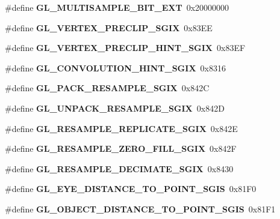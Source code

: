 \begin{DoxyCompactItemize}
\item 
\#define {\bfseries G\+L\+\_\+\+M\+U\+L\+T\+I\+S\+A\+M\+P\+L\+E\+\_\+\+B\+I\+T\+\_\+\+E\+X\+T}~0x20000000\label{_s_d_l__opengl_8h_ae7334e01278a1e31e28748ca8401ba36}

\item 
\#define {\bfseries G\+L\+\_\+\+V\+E\+R\+T\+E\+X\+\_\+\+P\+R\+E\+C\+L\+I\+P\+\_\+\+S\+G\+I\+X}~0x83\+E\+E\label{_s_d_l__opengl_8h_a042781876f40929162b2458d2ea5dafa}

\item 
\#define {\bfseries G\+L\+\_\+\+V\+E\+R\+T\+E\+X\+\_\+\+P\+R\+E\+C\+L\+I\+P\+\_\+\+H\+I\+N\+T\+\_\+\+S\+G\+I\+X}~0x83\+E\+F\label{_s_d_l__opengl_8h_a5ad3fa960e90332f3df0083db138e4cd}

\item 
\#define {\bfseries G\+L\+\_\+\+C\+O\+N\+V\+O\+L\+U\+T\+I\+O\+N\+\_\+\+H\+I\+N\+T\+\_\+\+S\+G\+I\+X}~0x8316\label{_s_d_l__opengl_8h_a436df34f89a945a336ac774004956901}

\item 
\#define {\bfseries G\+L\+\_\+\+P\+A\+C\+K\+\_\+\+R\+E\+S\+A\+M\+P\+L\+E\+\_\+\+S\+G\+I\+X}~0x842\+C\label{_s_d_l__opengl_8h_a9e20e46a2d1fa3ddfad995338c055c91}

\item 
\#define {\bfseries G\+L\+\_\+\+U\+N\+P\+A\+C\+K\+\_\+\+R\+E\+S\+A\+M\+P\+L\+E\+\_\+\+S\+G\+I\+X}~0x842\+D\label{_s_d_l__opengl_8h_a185fa0f99174308a66e712e70395bd9f}

\item 
\#define {\bfseries G\+L\+\_\+\+R\+E\+S\+A\+M\+P\+L\+E\+\_\+\+R\+E\+P\+L\+I\+C\+A\+T\+E\+\_\+\+S\+G\+I\+X}~0x842\+E\label{_s_d_l__opengl_8h_a389c1388b558612cd44b2c97e085bbc4}

\item 
\#define {\bfseries G\+L\+\_\+\+R\+E\+S\+A\+M\+P\+L\+E\+\_\+\+Z\+E\+R\+O\+\_\+\+F\+I\+L\+L\+\_\+\+S\+G\+I\+X}~0x842\+F\label{_s_d_l__opengl_8h_acbffee7ae25ff3daefc3a214a2a02a62}

\item 
\#define {\bfseries G\+L\+\_\+\+R\+E\+S\+A\+M\+P\+L\+E\+\_\+\+D\+E\+C\+I\+M\+A\+T\+E\+\_\+\+S\+G\+I\+X}~0x8430\label{_s_d_l__opengl_8h_aa966b3a339ec645bcb7f118f2ba7ce2c}

\item 
\#define {\bfseries G\+L\+\_\+\+E\+Y\+E\+\_\+\+D\+I\+S\+T\+A\+N\+C\+E\+\_\+\+T\+O\+\_\+\+P\+O\+I\+N\+T\+\_\+\+S\+G\+I\+S}~0x81\+F0\label{_s_d_l__opengl_8h_a8c81f466ea7fb0cc47a1e897f473ff66}

\item 
\#define {\bfseries G\+L\+\_\+\+O\+B\+J\+E\+C\+T\+\_\+\+D\+I\+S\+T\+A\+N\+C\+E\+\_\+\+T\+O\+\_\+\+P\+O\+I\+N\+T\+\_\+\+S\+G\+I\+S}~0x81\+F1\label{_s_d_l__opengl_8h_a94e12606c202e7a9968abf180b7a5926}


\end{DoxyCompactItemize}
